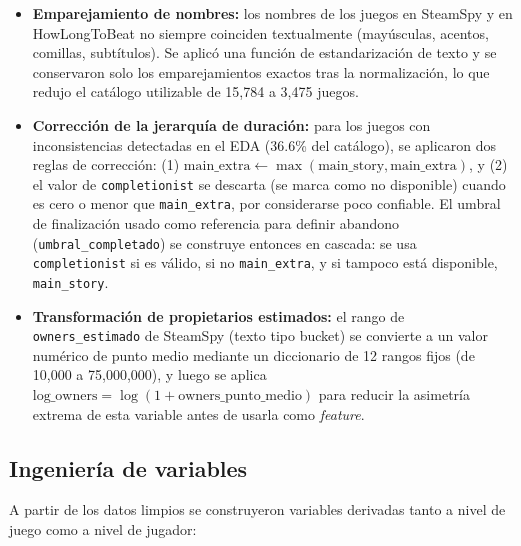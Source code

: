 \documentclass[11pt,letterpaper]{article}
\newcommand{\code}[1]{\texttt{\small #1}}
\begin{document}
\begin{itemize}
  \item \textbf{Emparejamiento de nombres:} los nombres de los juegos en SteamSpy y en HowLongToBeat no siempre coinciden textualmente (mayúsculas, acentos, comillas, subtítulos). Se aplicó una función de estandarización de texto y se conservaron solo los emparejamientos exactos tras la normalización, lo que redujo el catálogo utilizable de 15{,}784 a 3{,}475 juegos.
  \item \textbf{Corrección de la jerarquía de duración:} para los juegos con inconsistencias detectadas en el EDA (36.6\% del catálogo), se aplicaron dos reglas de corrección: (1) \(\text{main\_extra} \leftarrow \max(\text{main\_story}, \text{main\_extra})\), y (2) el valor de \code{completionist} se descarta (se marca como no disponible) cuando es cero o menor que \code{main\_extra}, por considerarse poco confiable. El umbral de finalización usado como referencia para definir abandono (\code{umbral\_completado}) se construye entonces en cascada: se usa \code{completionist} si es válido, si no \code{main\_extra}, y si tampoco está disponible, \code{main\_story}.
  \item \textbf{Transformación de propietarios estimados:} el rango de \code{owners\_estimado} de SteamSpy (texto tipo bucket) se convierte a un valor numérico de punto medio mediante un diccionario de 12 rangos fijos (de 10{,}000 a 75{,}000{,}000), y luego se aplica \(\text{log\_owners} = \log(1 + \text{owners\_punto\_medio})\) para reducir la asimetría extrema de esta variable antes de usarla como \textit{feature}.
\end{itemize}

\subsection{Ingeniería de variables}

A partir de los datos limpios se construyeron variables derivadas tanto a nivel de juego como a nivel de jugador:
\end{document}
